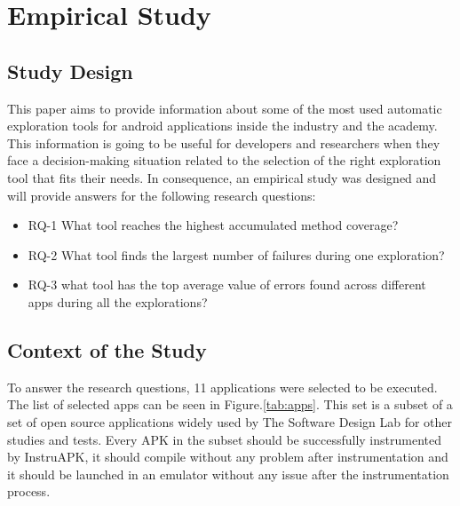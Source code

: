 
\chapter{Empirical Study} %

\label{Chapter4} %

\section{Study Design}\label{sec:studydesign}

This paper aims to provide information about some of the most used automatic exploration tools for android applications inside the industry and the academy. This information is going to be useful for developers and researchers when they face a decision-making situation related to the selection of the right exploration tool that fits their needs. In consequence, an empirical study was designed and will provide answers for the following research questions: 

\begin{itemize}

\item RQ-1 What tool reaches the highest accumulated method coverage?
\item RQ-2 What tool finds the largest number of failures during one exploration?
\item RQ-3 what tool has the top average value of errors found across different apps during all the explorations?
\end{itemize}

\section{Context of the Study}

To answer the research questions, 11 applications were selected to be executed. The list of selected apps can be seen in Figure.\ref{tab:apps}. This set is a subset of a set of open source applications widely used by  The Software Design Lab for other studies and tests. Every APK in the subset should be successfully instrumented by InstruAPK, it should compile without any problem after instrumentation and it should be launched in an emulator without any issue after the instrumentation process.

